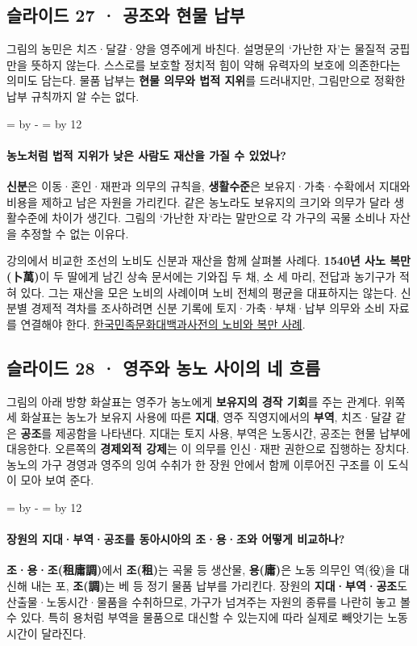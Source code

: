 \documentclass[10pt,a4paper]{article}
\newcommand{\ReserveQuestionSpace}{%
  \par\begingroup
  \dimen0=\pagegoal \advance\dimen0 by -\pagetotal
  \dimen2=\baselineskip \multiply\dimen2 by 12
  \ifdim\dimen0<\dimen2 \newpage\fi
  \endgroup}
\begin{document}
\subsection{슬라이드 27 · 공조와 현물 납부}
그림의 농민은 치즈·달걀·양을 영주에게 바친다. 설명문의 ‘가난한 자’는 물질적 궁핍만을 뜻하지 않는다. 스스로를 보호할 정치적 힘이 약해 유력자의 보호에 의존한다는 의미도 담는다. 물품 납부는 \textbf{현물 의무와 법적 지위}를 드러내지만, 그림만으로 정확한 납부 규칙까지 알 수는 없다.\par

\ReserveQuestionSpace
\paragraph{농노처럼 법적 지위가 낮은 사람도 재산을 가질 수 있었나?}
\textbf{신분}은 이동·혼인·재판과 의무의 규칙을, \textbf{생활수준}은 보유지·가축·수확에서 지대와 비용을 제하고 남은 자원을 가리킨다. 같은 농노라도 보유지의 크기와 의무가 달라 생활수준에 차이가 생긴다. 그림의 ‘가난한 자’라는 말만으로 각 가구의 곡물 소비나 자산을 추정할 수 없는 이유다.\par

강의에서 비교한 조선의 노비도 신분과 재산을 함께 살펴볼 사례다. \textbf{1540년 사노 복만(卜萬)}이 두 딸에게 남긴 상속 문서에는 기와집 두 채, 소 세 마리, 전답과 농기구가 적혀 있다. 그는 재산을 모은 노비의 사례이며 노비 전체의 평균을 대표하지는 않는다. 신분별 경제적 격차를 조사하려면 신분 기록에 토지·가축·부채·납부 의무와 소비 자료를 연결해야 한다. \href{https://encykorea.aks.ac.kr/Article/E0012757}{한국민족문화대백과사전의 노비와 복만 사례}.\par

\subsection{슬라이드 28 · 영주와 농노 사이의 네 흐름}
그림의 아래 방향 화살표는 영주가 농노에게 \textbf{보유지의 경작 기회}를 주는 관계다. 위쪽 세 화살표는 농노가 보유지 사용에 따른 \textbf{지대}, 영주 직영지에서의 \textbf{부역}, 치즈·달걀 같은 \textbf{공조}를 제공함을 나타낸다. 지대는 토지 사용, 부역은 노동시간, 공조는 현물 납부에 대응한다. 오른쪽의 \textbf{경제외적 강제}는 이 의무를 인신·재판 권한으로 집행하는 장치다. 농노의 가구 경영과 영주의 잉여 수취가 한 장원 안에서 함께 이루어진 구조를 이 도식이 모아 보여 준다.\par

\ReserveQuestionSpace
\paragraph{장원의 지대·부역·공조를 동아시아의 조·용·조와 어떻게 비교하나?}
\textbf{조·용·조(租庸調)}에서 \textbf{조(租)}는 곡물 등 생산물, \textbf{용(庸)}은 노동 의무인 역(役)을 대신해 내는 포, \textbf{조(調)}는 베 등 정기 물품 납부를 가리킨다. 장원의 \textbf{지대·부역·공조}도 산출물·노동시간·물품을 수취하므로, 가구가 넘겨주는 자원의 종류를 나란히 놓고 볼 수 있다. 특히 용처럼 부역을 물품으로 대신할 수 있는지에 따라 실제로 빼앗기는 노동시간이 달라진다.\par
\end{document}
